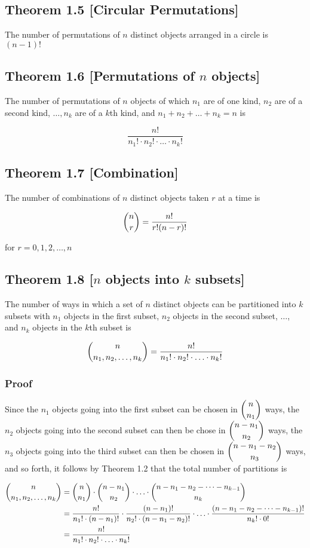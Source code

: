 \documentclass{article}
\begin{document}
\subsection*{Theorem 1.5 [Circular Permutations]} The number of permutations of \(n\) distinct objects arranged in a circle is \((n-1)!\)

\subsection*{Theorem 1.6 [Permutations of \(n\) objects]} The number of permutations of \(n\) objects of which \(n_1\) are of one kind, \(n_2\) are of a second kind, \(\ldots, n_k\) are of a \(k\)th kind, and \(n_1+n_2+\dots+n_k=n\) is

\[\frac{n!}{n_1! \cdot n_2! \cdot \ldots \cdot n_k!}\]

\subsection*{Theorem 1.7 [Combination]} The number of combinations of \(n\) distinct objects taken \(r\) at a time is 

\[\dbinom n r = \frac{n!}{r!(n-r)!}\]

for \(r=0,1,2,\ldots,n\)

\subsection*{Theorem 1.8 [\(n\) objects into \(k\) subsets]} The number of ways in which a set of \(n\) distinct objects can be partitioned into \(k\) subsets with \(n_1\) objects in the first subset, \(n_2\) objects in the second subset, \(\ldots\), and \(n_k\) objects in the \(k\)th subset is 

\[ \dbinom {n} {n_1, n_2, \ldots, n_k}=\frac{n!}{n_1! \cdot n_2! \cdot \ldots \cdot n_k!} \]

\subsubsection*{Proof} Since the \(n_1\) objects going into the first subset can be chosen in \(\dbinom n {n_1} \) ways, the \(n_2\) objects going into the second subset can then be chose in \( \dbinom {n-n_1} {n_2}\) ways, the \(n_3\) objects going into the third subset can then be chosen in \( \dbinom {n-n_1-n_2} {n_3}\) ways, and so forth, it follows by Theorem 1.2 that the total number of partitions is

\begin{align*}
\dbinom {n} {n_1,n_2,\ldots,n_k} &= \dbinom n {n_1} \cdot \dbinom {n - n_1} {n_2} \cdot \ldots \cdot \dbinom {n-n_1-n_2-\cdots -n_{k-1}}{n_k}\\
&= \frac{n!}{n_1! \cdot (n-n_1)!} \cdot \frac{(n-n_1)!}{n_2! \cdot (n-n_1-n_2)!} \cdot \ldots \cdot \frac{(n-n_1-n_2-\cdots-n_{k-1})!}{n_k! \cdot 0!}\\
&= \frac{n!}{n_1! \cdot n_2! \cdot \ldots \cdot n_k!}
\end{align*}
\end{document}

